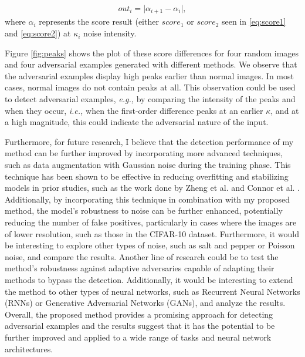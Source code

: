 \begin{align}
    \label{eq:first-order-diff}
    out_i= \lvert \alpha_{i+1} - \alpha_{i} \rvert,
\end{align}
where $\alpha_i$ represents the score result (either $score_1$ or $score_2$ seen
in \ref{eq:score1} and \ref{eq:score2}) at $\kappa_i$ noise intensity.

Figure \ref{fig:peaks} shows the plot of these score differences for four random
images and four adversarial examples generated with different methods. We
observe that the adversarial examples display high peaks earlier than normal
images. In most cases, normal images do not contain peaks at all. This
observation could be used to detect adversarial examples, \emph{e.g.,} by
comparing the intensity of the peaks and when they occur, \emph{i.e.,} when the
first-order difference peaks at an earlier $\kappa$, and at a high magnitude,
this could indicate the adversarial nature of the input.

Furthermore, for future research, I believe that the detection performance of my
method can be further improved by incorporating more advanced techniques, such
as data augmentation with Gaussian noise during the training phase. This
technique has been shown to be effective in reducing overfitting and stabilizing
models in prior studies, such as the work done by Zheng et al.
\cite{zheng_improving_2016} and Connor et al.
\cite{connor_survey_augmentation_2019}. Additionally, by incorporating this
technique in combination with my proposed method, the model's robustness to
noise can be further enhanced, potentially reducing the number of false
positives, particularly in cases where the images are of lower resolution, such
as those in the CIFAR-10 dataset. Furthermore, it would be interesting to
explore other types of noise, such as salt and pepper or Poisson noise, and
compare the results. Another line of research could be to test the method's
robustness against adaptive adversaries capable of adapting their methods to
bypass the detection. Additionally, it would be interesting to extend the method
to other types of neural networks, such as Recurrent Neural Networks (RNNs) or
Generative Adversarial Networks (GANs), and analyze the results. Overall, the
proposed method provides a promising approach for detecting adversarial examples
and the results suggest that it has the potential to be further improved and
applied to a wide range of tasks and neural network architectures.